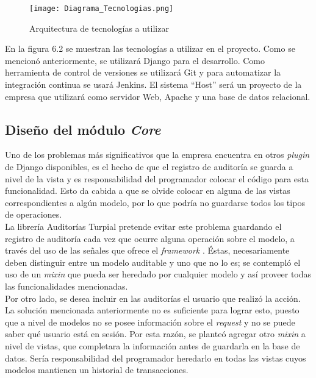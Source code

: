 \begin{figure}
\centering
\texttt{[image: Diagrama\_Tecnologias.png]}
\caption{Arquitectura de tecnologías a utilizar}
\label{fig:figure6.2}
\end{figure}

En la figura 6.2 se muestran las tecnologías a utilizar en el proyecto. Como se mencionó anteriormente, se utilizará Django para el desarrollo. Como herramienta de control de versiones se utilizará Git y para automatizar la integración continua se usará Jenkins. El sistema “Host” será un proyecto de la empresa que utilizará como servidor Web, Apache y una base de datos relacional.

\subsection{Diseño del módulo \textit{Core}}

Uno de los problemas más significativos que la empresa encuentra en otros \textit{plugin} de Django disponibles, es el hecho de que el registro de auditoría se guarda a nivel de la vista y es responsabilidad del programador colocar el código para esta funcionalidad. Esto da cabida a que se olvide colocar en alguna de las vistas correspondientes a algún modelo, por lo que podría no guardarse todos los tipos de operaciones. \\

La librería Auditorías Turpial pretende evitar este problema guardando el registro de auditoría cada vez que ocurre alguna operación sobre el modelo, a través del uso de las señales que ofrece el \textit{framework} . Éstas, necesariamente deben distinguir entre un modelo auditable y uno que no lo es; se contempló el uso de un \textit{mixin} que pueda ser heredado por cualquier modelo y así proveer todas las funcionalidades mencionadas. \\

Por otro lado, se desea incluir en las auditorías el usuario que realizó la acción. La solución mencionada anteriormente no es suficiente para lograr esto, puesto que a nivel de modelos no se posee información sobre el \textit{request} y no se puede saber qué usuario está en sesión. Por esta razón, se planteó agregar otro \textit{mixin} a nivel de vistas, que completara la información antes de guardarla en la base de datos. Sería responsabilidad del programador heredarlo en todas las vistas cuyos modelos mantienen un historial de transacciones.\\


